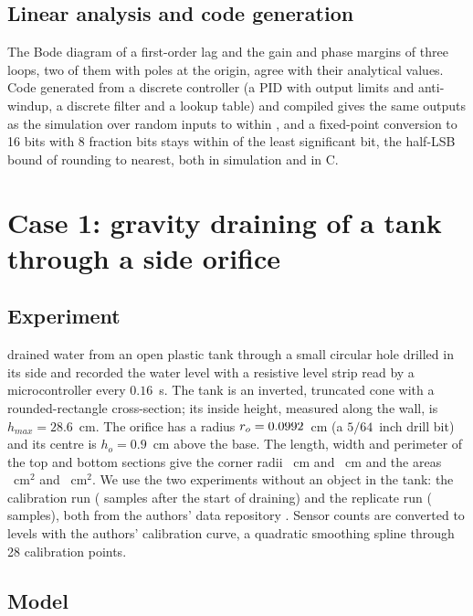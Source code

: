 \documentclass{jfm}
\begin{document}
\subsection{Linear analysis and code generation}

The Bode diagram of a first-order lag and the gain and phase
margins of three loops, two of them with poles at the origin, agree with their analytical values. Code generated
from a discrete controller (a PID with output limits and anti-windup, a discrete filter and a lookup table) and
compiled gives the same outputs as the simulation over \SilSteps{} random inputs to within \SilDiff{}, and a
fixed-point conversion to 16 bits with 8 fraction bits stays within \FixLSB{} of the least significant bit, the
half-LSB bound of rounding to nearest, both in simulation and in C.

\section{Case 1: gravity draining of a tank through a side orifice}\label{sec:tank}

\subsection{Experiment}

\citet{Fabusola2025} drained water from an open plastic tank through a small circular hole drilled in its side and
recorded the water level with a resistive level strip read by a microcontroller every $0.16$~s. The tank is an
inverted, truncated cone with a rounded-rectangle cross-section; its inside height, measured along the wall, is
$h_{max} = 28.6$~cm. The
orifice has a radius $r_o = 0.0992$~cm (a $5/64$~inch drill bit) and its centre is $h_o = 0.9$~cm above the base.
The length, width and perimeter of the top and bottom sections give the corner radii \RTop~cm and \RBottom~cm and
the areas \AreaTop~cm$^2$ and \AreaBottom~cm$^2$. We use the two experiments without an object in the tank: the
calibration run (\TrainN{} samples after the start of draining) and the replicate run (\TestN{} samples), both
from the authors' data repository \citep{FabusolaData}. Sensor counts are converted to levels with the authors'
calibration curve, a quadratic smoothing spline through 28 calibration points.

\subsection{Model}
\end{document}
